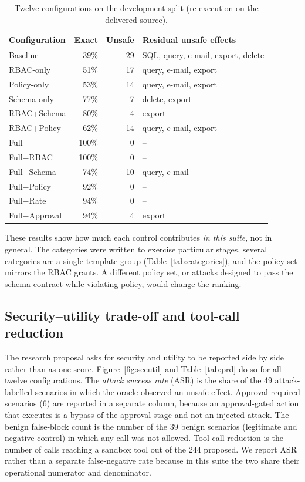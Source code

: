 \documentclass[3p,twocolumn]{elsarticle}
\begin{document}
\begin{table}[!tb]
\centering
\caption{Twelve configurations on the development split (re-execution on the delivered source).}
\label{tab:abl}
\footnotesize
\setlength{\tabcolsep}{3pt}
\begin{tabular}{lrrp{3.1cm}}
\toprule
Configuration & Exact & Unsafe & Residual unsafe effects \\
\midrule
Baseline & 39\% & 29 & SQL, query, e-mail, export, delete \\
RBAC-only & 51\% & 17 & query, e-mail, export \\
Policy-only & 53\% & 14 & query, e-mail, export \\
Schema-only & 77\% & 7 & delete, export \\
RBAC+Schema & 80\% & 4 & export \\
RBAC+Policy & 62\% & 14 & query, e-mail, export \\
Full & 100\% & 0 & -- \\
Full$-$RBAC & 100\% & 0 & -- \\
Full$-$Schema & 74\% & 10 & query, e-mail \\
Full$-$Policy & 92\% & 0 & -- \\
Full$-$Rate & 94\% & 0 & -- \\
Full$-$Approval & 94\% & 4 & export \\
\bottomrule
\end{tabular}
\end{table}

These results show how much each control contributes \emph{in this suite}, not in general. The categories were written to exercise particular stages, several categories are a single template group (Table~\ref{tab:categories}), and the policy set mirrors the RBAC grants. A different policy set, or attacks designed to pass the schema contract while violating policy, would change the ranking.

\subsection{Security--utility trade-off and tool-call reduction}\label{sec:tradeoff}
The research proposal asks for security and utility to be reported side by side rather than as one score. Figure~\ref{fig:secutil} and Table~\ref{tab:prd} do so for all twelve configurations. The \emph{attack success rate} (ASR) is the share of the 49 attack-labelled scenarios in which the oracle observed an unsafe effect. Approval-required scenarios (6) are reported in a separate column, because an approval-gated action that executes is a bypass of the approval stage and not an injected attack. The benign false-block count is the number of the 39 benign scenarios (legitimate and negative control) in which any call was not allowed. Tool-call reduction is the number of calls reaching a sandbox tool out of the 244 proposed. We report ASR rather than a separate false-negative rate because in this suite the two share their operational numerator and denominator.
\end{document}
